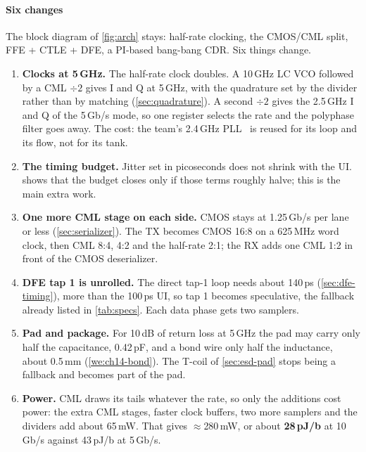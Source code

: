 \paragraph{Six changes} The block diagram of \cref{fig:arch} stays: half-rate clocking, the CMOS/CML split, FFE + CTLE + DFE, a PI-based bang-bang CDR. Six things change.
\begin{enumerate}
  \item \textbf{Clocks at 5\,GHz.} The half-rate clock doubles. A 10\,GHz LC VCO followed by a CML $\div2$ gives I and Q at 5\,GHz, with the quadrature set by the divider rather than by matching (\cref{sec:quadrature}). A second $\div2$ gives the 2.5\,GHz I and Q of the 5\,Gb/s mode, so one register selects the rate and the polyphase filter goes away. The cost: the team's 2.4\,GHz PLL~\cite{smacd2026pll} is reused for its loop and its flow, not for its tank.
  \item \textbf{The timing budget.} Jitter set in picoseconds does not shrink with the UI.  shows that the budget closes only if those terms roughly halve; this is the main extra work.
  \item \textbf{One more CML stage on each side.} CMOS stays at 1.25\,Gb/s per lane or less (\cref{sec:serializer}). The TX becomes CMOS 16:8 on a 625\,MHz word clock, then CML 8:4, 4:2 and the half-rate 2:1; the RX adds one CML 1:2 in front of the CMOS deserializer.
  \item \textbf{DFE tap 1 is unrolled.} The direct tap-1 loop needs about 140\,ps (\cref{sec:dfe-timing}), more than the 100\,ps UI, so tap 1 becomes speculative, the fallback already listed in \cref{tab:specs}. Each data phase gets two samplers.
  \item \textbf{Pad and package.} For 10\,dB of return loss at 5\,GHz the pad may carry only half the capacitance, 0.42\,pF, and a bond wire only half the inductance, about 0.5\,mm (\cref{we:ch14-bond}). The T-coil of \cref{sec:esd-pad} stops being a fallback and becomes part of the pad.
  \item \textbf{Power.} CML draws its tails whatever the rate, so only the additions cost power: the extra CML stages, faster clock buffers, two more samplers and the dividers add about 65\,mW. That gives $\approx$280\,mW, or about \textbf{28\,pJ/b} at 10\,Gb/s against 43\,pJ/b at 5\,Gb/s.
\end{enumerate}

